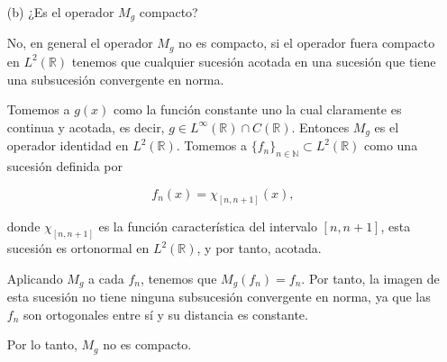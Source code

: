 \begin{itemize}
\begin{proof}
lo cual contradice la desigualdad anterior cuando $\varepsilon \to 0$. Por tanto, $\lambda \in \sigma(M_g)$. Como el espectro $\sigma(M_g)$ es cerrado, se concluye que,

\[
\overline{\{g(x) : x \in \mathbb{R}\}} \subseteq \sigma(M_g).
\]



\end{proof}
\item[(b)] ¿Es el operador $M_g$ compacto? 
\begin{sol}
No, en general el operador \( M_g \) no es compacto, si el operador fuera compacto en \( L^2(\mathbb{R}) \) tenemos que cualquier sucesión acotada en una sucesión que tiene una subsucesión convergente en norma.

Tomemos a $g(x)$ como la función constante uno la cual claramente es continua y acotada, es decir, \( g \in L^\infty(\mathbb{R}) \cap C(\mathbb{R}) \). Entonces \( M_g \) es el operador identidad en \( L^2(\mathbb{R}) \). Tomemos a  \( \{f_n\}_{n \in \mathbb{N}} \subset L^2(\mathbb{R}) \) como una sucesión definida por

\[
f_n(x) = \chi_{[n, n+1]}(x),
\]

donde \( \chi_{[n,n+1]} \) es la función característica del intervalo \( [n, n+1] \), esta sucesión es ortonormal en \( L^2(\mathbb{R}) \), y por tanto, acotada.

Aplicando \( M_g \) a cada \( f_n \), tenemos que \( M_g(f_n) = f_n \). Por tanto, la imagen de esta sucesión no tiene ninguna subsucesión convergente en norma, ya que las \( f_n \) son ortogonales entre sí y su distancia es constante.

Por lo tanto, \( M_g \) no es compacto.
\end{sol}

\end{itemize}
